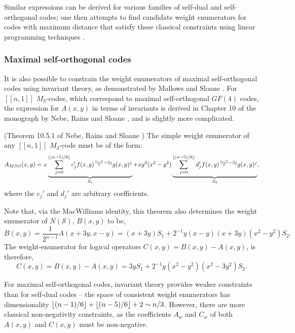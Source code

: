 \documentclass[11pt]{article}
\DeclarePairedDelimiter\floor{\lfloor}{\rfloor}
\begin{document}
Similar expressions can be derived for various families of self-dual and self-orthogonal codes; one then attempts to find candidate weight enumerators for codes with maximum distance that satisfy these classical constraints using linear programming techniques \cite{MALLOWS1973188, macwilliams1978self, conway1990new, rains,  rains2003new}.



\subsubsection{Maximal self-orthogonal codes}
It is also possible to constrain the weight enumerators of maximal self-orthogonal codes using invariant theory, as demonstrated by Mallows and Sloane \cite{mallows1974weight, mallows1981weight}. For $[[n,1]]$ $M_3$-codes, which correspond to maximal self-orthogonal $GF(4)$ codes, the expression for $A(x,y)$ in terms of invariants is derived in Chapter 10 of the monograph by Nebe, Rains and Sloane \cite{nebe2006self}, and is slightly more complicated.
\begin{theorem}(Theorem 10.5.1 of Nebe, Rains and Sloane \cite{nebe2006self})
The simple weight enumerator of any $[[n,1]]$ $M_3$-code must be of the form:
\begin{equation}
A_{MSO}(x,y) = x \underbrace{\sum_{j=0}^{\floor{(n-1)/6}}c_j'  f(x,y)^{\frac{n-1}{2}-3 j}  g(x,y)^{j}}_{S_{1}} + xy^2 (x^2-y^2) \underbrace{\sum_{j=0}^{\floor{(n-5)/6}} d_j'  f(x,y)^{\frac{n-5}{2} -3j}  g(x,y)^{j}}_{S_{2}}, 
\label{Aeq}
\end{equation}
where the $c_j'$ and $d_j'$ are arbitrary coefficients. \label{invariant-theorem}
\end{theorem}
Note that, via the MacWilliams identity, this theorem also determines the weight enumerator of $N(\mathcal S)$,  $B(x,y)$ 
to be, 
\begin{equation}
    B(x,y) = \frac{1}{2^{n-1}} A(x+3y,x-y) = (x+3y)  S_1 +2^{-1} y (x-y) (x+3 y)(x^2-y^2) S_2.
\label{Beq}
\end{equation}
The weight-enumerator for logical operators $C(x,y)=B(x,y)-A(x,y)$, is therefore,
\begin{dmath}
    C(x,y)=B(x,y)-A(x,y) = 3y S_1 +2^{-1} y (x^2 - y^2)(x^2 - 3 y^2) S_2.
\label{Ceq}
\end{dmath}

For maximal self-orthogonal codes, invariant theory provides weaker constraints than for self-dual codes -- the space of consistent weight enumerators has dimensionality $\floor{(n-1)/6}+\floor{(n-5)/6}+2 \sim n/3$. However, there are more classical non-negativity constraints, as the coefficients $A_w$ and $C_w$ of both $A(x,y)$ and $C(x,y)$ must be non-negative. 
\end{document}
